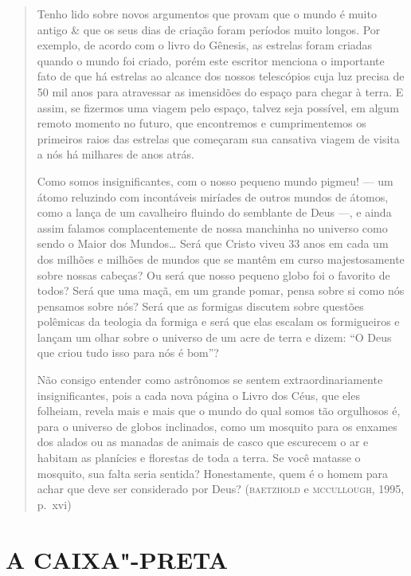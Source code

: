 \begin{quote}
Tenho lido sobre novos argumentos que provam que o mundo é muito antigo \&
que os seus dias de criação foram períodos muito longos. Por exemplo, de
acordo com o livro do Gênesis, as estrelas foram criadas quando o mundo
foi criado, porém este escritor menciona o importante fato de que há
estrelas ao alcance dos nossos telescópios cuja luz precisa de 50 mil anos
para atravessar as imensidões do espaço para chegar à terra. E assim, se
fizermos uma viagem pelo espaço, talvez seja possível, em algum remoto
momento no futuro, que encontremos e cumprimentemos os primeiros raios das
estrelas que começaram sua cansativa viagem de visita a nós há milhares de
anos atrás.

Como somos insignificantes, com o nosso pequeno mundo pigmeu! --- um átomo
reluzindo com incontáveis miríades de outros mundos de átomos, como a lança
de um cavalheiro fluindo do semblante de Deus ---, e ainda assim falamos
complacentemente de nossa manchinha no universo como sendo o Maior dos
Mundos\ldots{} Será que Cristo viveu 33 anos em cada um dos milhões e milhões
de mundos que se mantêm em curso majestosamente sobre nossas cabeças? Ou
será que nosso pequeno globo foi o favorito de todos? Será que uma maçã,
em um grande pomar, pensa sobre si como nós pensamos sobre nós? Será que
as formigas discutem sobre questões polêmicas da teologia da formiga e
será que elas escalam os formigueiros e lançam um olhar sobre o universo
de um acre de terra e dizem: “O Deus que criou tudo isso para nós é bom”?

Não consigo entender como astrônomos se sentem extraordinariamente
insignificantes, pois a cada nova página o Livro dos Céus, que eles
folheiam, revela mais e mais que o mundo do qual somos tão
orgulhosos é, para o universo de globos inclinados, como um mosquito
para os enxames dos alados ou as manadas de animais de casco que
escurecem o ar e habitam as planícies e florestas de toda a terra. Se você
matasse o mosquito, sua falta seria sentida? Honestamente, quem é o
homem para achar que deve ser considerado por Deus? (\textsc{baetzhold} e
\textsc{mccullough}, 1995, p.~xvi)
\end{quote}

\section{A CAIXA"-PRETA}

